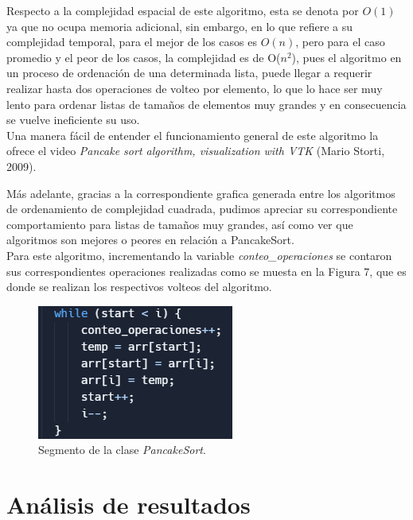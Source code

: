 \documentclass[a4paper,12pt]{article}
\begin{document}
Respecto a la complejidad espacial de este algoritmo, esta se denota por $O(1)$ ya que no ocupa memoria adicional, sin embargo, en lo que refiere a su complejidad temporal, para el mejor de los casos es $O(n)$, pero para el caso promedio y el peor de los casos, la complejidad es de O($n^2$), pues el algoritmo en un proceso de ordenación de una determinada lista, puede llegar a requerir realizar hasta dos operaciones de volteo por elemento, lo que lo hace ser muy lento para ordenar listas de tamaños de elementos muy grandes y en consecuencia se vuelve ineficiente su uso.\cite{gfg-2023}\\

Una manera fácil de entender el funcionamiento general de este algoritmo la ofrece el video \textit{Pancake sort algorithm, visualization with VTK} (Mario Storti, 2009)\cite{video-vtk}.

Más adelante, gracias a la correspondiente grafica generada entre los algoritmos de ordenamiento de complejidad cuadrada, pudimos apreciar su correspondiente comportamiento para listas de tamaños muy grandes, así como ver que algoritmos son mejores o peores en relación a PancakeSort.\\

Para este algoritmo, incrementando la variable \textit{conteo\_operaciones} se contaron sus correspondientes operaciones realizadas como se muesta en la Figura 7, que es donde se realizan los respectivos volteos del algoritmo.

\begin{figure}[h]
    \centering
    \includegraphics[width=0.8\linewidth]{media/segmento_pancake.png}
    \caption{Segmento de la clase \textit{PancakeSort}.}
    \label{fig:seg-pancake}
\end{figure}

\section{Análisis de resultados}
\end{document}
